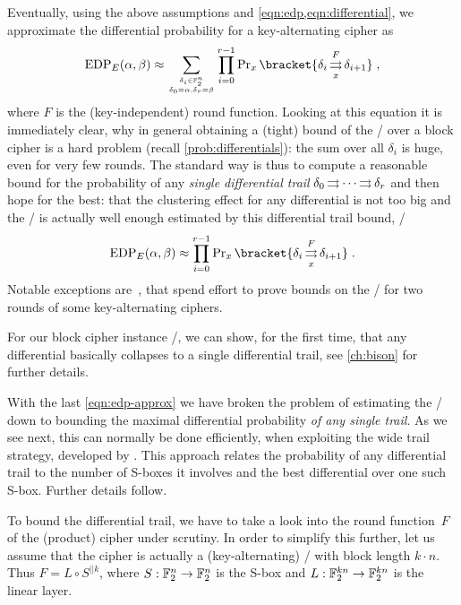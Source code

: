 Eventually, using the above assumptions and \cref{eqn:edp,eqn:differential}, we approximate the differential probability for a key-alternating cipher as
\begin{equation*}
    \mathrm{EDP}_E(\alpha, \beta)
    \approx \sum_{\tower{\delta_i \in \F_2^n}{\delta_0 = \alpha, \delta_r = \beta}}
      \prod_{i=0}^{r-1} \Prob_x\bracket{\propDiff{\delta_i}{F}{x}{\delta_{i+1}}}\;,
\end{equation*}
where $F$ is the (key-independent) round function.
Looking at this equation it is immediately clear, why in general obtaining a (tight) bound of the \MEDP/ over a block cipher is a hard problem (recall \cref{prob:differentials}): the sum over all $\delta_i$ is huge, even for very few rounds.
The standard way is thus to compute a reasonable bound for the probability of any \emph{single differential trail} $\delta_0 \operatorname*{\rightrightarrows}^{}_{} \cdots \operatorname*{\rightrightarrows}^{}_{} \delta_{r}$ and then hope for the best: that the clustering effect for any differential is not too big and the \EDP/ is actually well enough estimated by this differential trail bound, \ie/
\begin{equation}\label{eqn:edp-approx}
    \mathrm{EDP}_E(\alpha, \beta)
    \approx \prod_{i=0}^{r-1} \Prob_x\bracket{\propDiff{\delta_i}{F}{x}{\delta_{i+1}}}\;.
\end{equation}
Notable exceptions are~, that spend effort to prove bounds on the \MEDP/ for two rounds of some key-alternating ciphers.

For our block cipher instance \bison/, we can show, for the first time, that any differential basically collapses to a single differential trail, see \cref{ch:bison} for further details.

With the last \cref{eqn:edp-approx} we have broken the problem of estimating the \MEDP/ down to bounding the maximal differential probability \emph{of any single trail}.
As we see next, this can normally be done efficiently, when exploiting the wide trail strategy, developed by \textcite{PhD:Daemen95}.
This approach relates the probability of any differential trail to the number of S-boxes it involves and the best differential over one such S-box.
Further details follow.

To bound the differential trail, we have to take a look into the round function~$F$ of the (product) cipher under scrutiny.
In order to simplify this further, let us assume that the cipher is actually a (key-alternating) \SPN/ with block length $k \cdot n$.
Thus $F = L \circ S^{||k}$, where $S : \mathbb{F}_2^n \to \mathbb{F}_2^n$ is the S-box and $L : \mathbb{F}_2^{kn} \to \mathbb{F}_2^{kn}$ is the linear layer.

